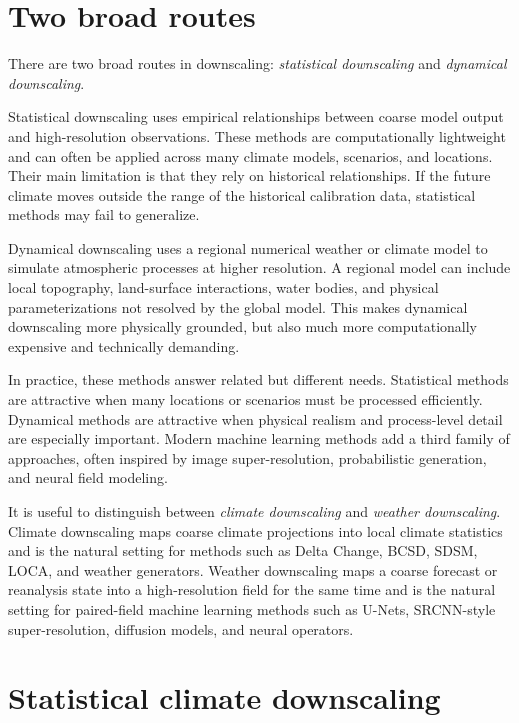 \documentclass[11pt]{article}
\begin{document}
\section{Two broad routes}

There are two broad routes in downscaling: \emph{statistical downscaling} and \emph{dynamical downscaling}.

Statistical downscaling uses empirical relationships between coarse model output and high-resolution observations. These methods are computationally lightweight and can often be applied across many climate models, scenarios, and locations. Their main limitation is that they rely on historical relationships. If the future climate moves outside the range of the historical calibration data, statistical methods may fail to generalize.

Dynamical downscaling uses a regional numerical weather or climate model to simulate atmospheric processes at higher resolution. A regional model can include local topography, land-surface interactions, water bodies, and physical parameterizations not resolved by the global model. This makes dynamical downscaling more physically grounded, but also much more computationally expensive and technically demanding.

In practice, these methods answer related but different needs. Statistical methods are attractive when many locations or scenarios must be processed efficiently. Dynamical methods are attractive when physical realism and process-level detail are especially important. Modern machine learning methods add a third family of approaches, often inspired by image super-resolution, probabilistic generation, and neural field modeling.

It is useful to distinguish between \emph{climate downscaling} and \emph{weather downscaling}. Climate downscaling maps coarse climate projections into local climate statistics and is the natural setting for methods such as Delta Change, BCSD, SDSM, LOCA, and weather generators. Weather downscaling maps a coarse forecast or reanalysis state into a high-resolution field for the same time and is the natural setting for paired-field machine learning methods such as U-Nets, SRCNN-style super-resolution, diffusion models, and neural operators.

\section{Statistical climate downscaling}
\end{document}
